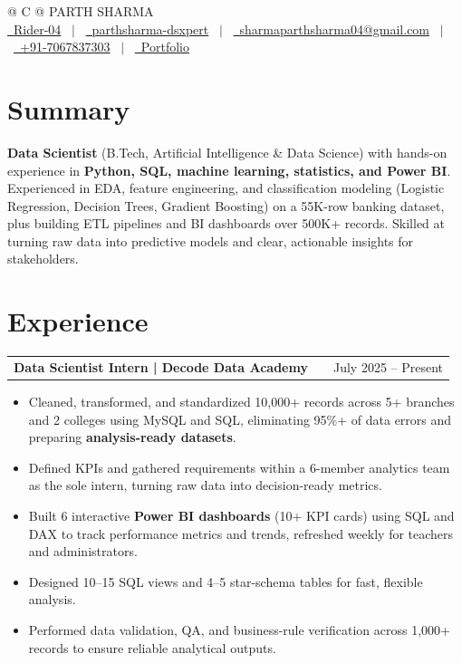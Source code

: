 \documentclass[a4paper,12pt]{article}
\makeatletter
\newenvironment{joblong}[2]
    {
    \begin{tabularx}{\linewidth}{@{}l X r@{}}
    \textbf{#1} & \hfill &  #2 \\[3.75pt]
    \end{tabularx}
    \begin{minipage}[t]{\linewidth}
    \begin{itemize}[nosep,after=\strut, leftmargin=1em, itemsep=3pt,label=--]
    }
    {
    \end{itemize}
    \end{minipage}
    }
\makeatother
\begin{document}
\pagestyle{empty}

\begin{tabularx}{\linewidth}{@{} C @{}}
\Huge{PARTH SHARMA} \\[7.5pt]
\href{https://github.com/Rider-04}{\raisebox{-0.05\height}\faGithub\ Rider-04} \ $|$ \
\href{https://www.linkedin.com/in/parthsharma-dsxpert}{\raisebox{-0.05\height}\faLinkedin\ parthsharma-dsxpert} \ $|$ \
\href{mailto:sharmaparthsharma04@gmail.com}{\raisebox{-0.05\height}\faEnvelope \ sharmaparthsharma04@gmail.com} \ $|$ \
\href{tel:+917067837303}{\raisebox{-0.05\height}\faMobile \ +91-7067837303} \ $|$ \
\href{https://parth-portfolio-virid.vercel.app/}{\raisebox{-0.05\height}\faGlobe \ Portfolio}\end{tabularx}


\section{Summary}
\textbf{Data Scientist} (B.Tech, Artificial Intelligence \& Data Science) with hands-on experience in \textbf{Python, SQL, machine learning, statistics, and Power BI}. Experienced in EDA, feature engineering, and classification modeling (Logistic Regression, Decision Trees, Gradient Boosting) on a 55K-row banking dataset, plus building ETL pipelines and BI dashboards over 500K+ records. Skilled at turning raw data into predictive models and clear, actionable insights for stakeholders.

\section{Experience}

\begin{joblong}{Data Scientist Intern | Decode Data Academy}{July 2025 -- Present}
\item Cleaned, transformed, and standardized 10,000+ records across 5+ branches and 2 colleges using MySQL and SQL, eliminating 95\%+ of data errors and preparing \textbf{analysis-ready datasets}.
\item Defined KPIs and gathered requirements within a 6-member analytics team as the sole intern, turning raw data into decision-ready metrics.
\item Built 6 interactive \textbf{Power BI dashboards} (10+ KPI cards) using SQL and DAX to track performance metrics and trends, refreshed weekly for teachers and administrators.
\item Designed 10--15 SQL views and 4--5 star-schema tables for fast, flexible analysis.
\item Performed data validation, QA, and business-rule verification across 1,000+ records to ensure reliable analytical outputs.
\vspace{10pt}
\end{joblong}
\end{document}
